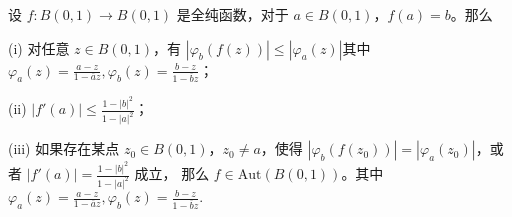 \documentclass[../../main.tex]{subfiles}
\begin{document}
\begin{theorem}\label{theorem:Schwarz-Pick定理-定理4.5.6}
设 \( f: B(0,1) \to B(0,1) \) 是全纯函数，对于 \( a \in B(0,1) \)，\( f(a) = b \)。那么

(i) 对任意 \( z \in B(0,1) \)，有 \( |\varphi_b(f(z))| \leqslant  |\varphi_a(z)| \)其中$\varphi_a(z) = \frac{a - z}{1 - \overline{a} z},\varphi_b(z) = \frac{b - z}{1 - \overline{b} z}$；

(ii) \( |f'(a)| \leqslant  \frac{1 - |b|^2}{1 - |a|^2} \)；

(iii) 如果存在某点 \( z_0 \in B(0,1) \)，\( z_0 \neq a \)，使得 \( |\varphi_b(f(z_0))| = |\varphi_a(z_0)| \)，或者 \( |f'(a)| = \frac{1 - |b|^2}{1 - |a|^2} \) 成立，
那么 \( f \in \text{Aut}(B(0,1)) \)。其中$\varphi_a(z) = \frac{a - z}{1 - \overline{a} z},\varphi_b(z) = \frac{b - z}{1 - \overline{b} z}.$
\end{theorem}
\end{document}
